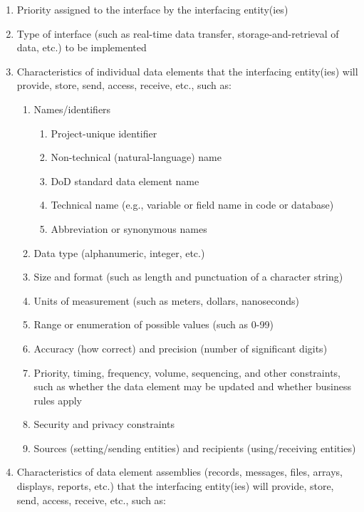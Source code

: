\documentclass{fidata-report-template}
\begin{document}
\begin{enumerate}
\itemsep1pt\parskip0pt
\item
  Priority assigned to the interface by the interfacing entity(ies)
\item
  Type of interface (such as real-time data transfer,
  storage-and-retrieval of data, etc.) to be implemented
\item
  Characteristics of individual data elements that the interfacing
  entity(ies) will provide, store, send, access, receive, etc., such as:

  \begin{enumerate}
  \itemsep1pt\parskip0pt
  \item
    Names/identifiers

    \begin{enumerate}
    \itemsep1pt\parskip0pt
    \item
      Project-unique identifier
    \item
      Non-technical (natural-language) name
    \item
      DoD standard data element name
    \item
      Technical name (e.g., variable or field name in code or database)
    \item
      Abbreviation or synonymous names
    \end{enumerate}
  \item
    Data type (alphanumeric, integer, etc.)
  \item
    Size and format (such as length and punctuation of a character
    string)
  \item
    Units of measurement (such as meters, dollars, nanoseconds)
  \item
    Range or enumeration of possible values (such as 0-99)
  \item
    Accuracy (how correct) and precision (number of significant digits)
  \item
    Priority, timing, frequency, volume, sequencing, and other
    constraints, such as whether the data element may be updated and
    whether business rules apply
  \item
    Security and privacy constraints
  \item
    Sources (setting/sending entities) and recipients (using/receiving
    entities)
  \end{enumerate}
\item
  Characteristics of data element assemblies (records, messages, files,
  arrays, displays, reports, etc.) that the interfacing entity(ies) will
  provide, store, send, access, receive, etc., such as:


\end{enumerate}
\end{document}
